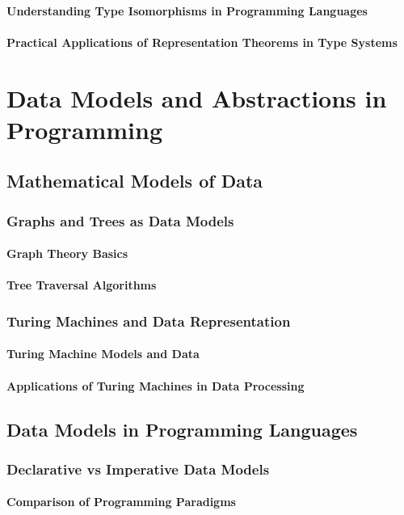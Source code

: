 \documentclass[12pt, oneside]{book}
\begin{document}
\subsubsection{Understanding Type Isomorphisms in Programming Languages}
\subsubsection{Practical Applications of Representation Theorems in Type Systems}

\chapter{Data Models and Abstractions in Programming}
\section{Mathematical Models of Data}
\subsection{Graphs and Trees as Data Models}
\subsubsection{Graph Theory Basics}
\subsubsection{Tree Traversal Algorithms}
\subsection{Turing Machines and Data Representation}
\subsubsection{Turing Machine Models and Data}
\subsubsection{Applications of Turing Machines in Data Processing}
\section{Data Models in Programming Languages}
\subsection{Declarative vs Imperative Data Models}
\subsubsection{Comparison of Programming Paradigms}
\end{document}
